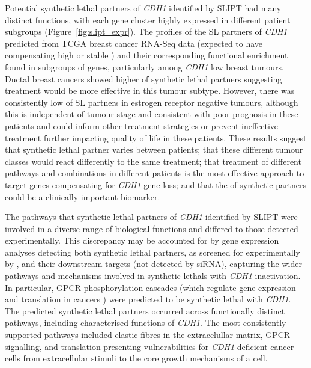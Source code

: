 Potential \gls{synthetic lethal} partners of \textit{CDH1} identified by \gls{SLIPT} had many distinct functions, with each gene cluster highly expressed in different patient subgroups (Figure~\ref{fig:slipt_expr}). The  profiles of the SL partners of \textit{CDH1} predicted from \gls{TCGA} breast cancer \acrshort{RNA}-Seq data (expected to have compensating high or stable ) and their corresponding functional enrichment found  in subgroups of genes, particularly among \textit{CDH1} low breast tumours.  Ductal breast cancers showed higher  of \gls{synthetic lethal} partners suggesting \gls{treatment} would be more effective in this tumour subtype.  However, there was consistently low  of SL partners in estrogen receptor negative tumours, although this is independent of tumour stage and consistent with poor \gls{prognosis} in these patients and could inform other \gls{treatment} strategies or prevent ineffective \gls{treatment} further impacting quality of life in these patients.  These results suggest that \gls{synthetic lethal} partner  varies between patients; that these different tumour classes would react differently to the same \gls{treatment}; that \gls{treatment} of different pathways and combinations in different patients is the most effective approach to target genes compensating for \textit{CDH1} gene loss; and that the  of synthetic partners could be a clinically important biomarker.  

The pathways that \gls{synthetic lethal} partners of \textit{CDH1} identified by \gls{SLIPT} were involved in a diverse range of biological functions and differed to those detected experimentally. This discrepancy may be accounted for by \gls{gene expression} analyses detecting both \gls{synthetic lethal} partners, as screened for experimentally by \citet{Telford2015}, and their downstream targets (not detected by \gls{siRNA}), capturing the wider pathways and mechanisms involved in \glspl{synthetic lethal} with \textit{CDH1} inactivation. In particular, \gls{GPCR} phosphorylation cascades (which regulate \gls{gene expression} and translation in cancers \citep{Gao2015}) were predicted to be \gls{synthetic lethal} with \textit{CDH1}. The predicted \gls{synthetic lethal} partners occurred across functionally distinct pathways, including characterised functions of \textit{CDH1}. The most consistently supported pathways included elastic fibres in the extracelullar matrix, \gls{GPCR} signalling, and translation presenting vulnerabilities for \textit{CDH1} deficient cancer cells from extracellular stimuli to the core growth mechanisms of a cell.

